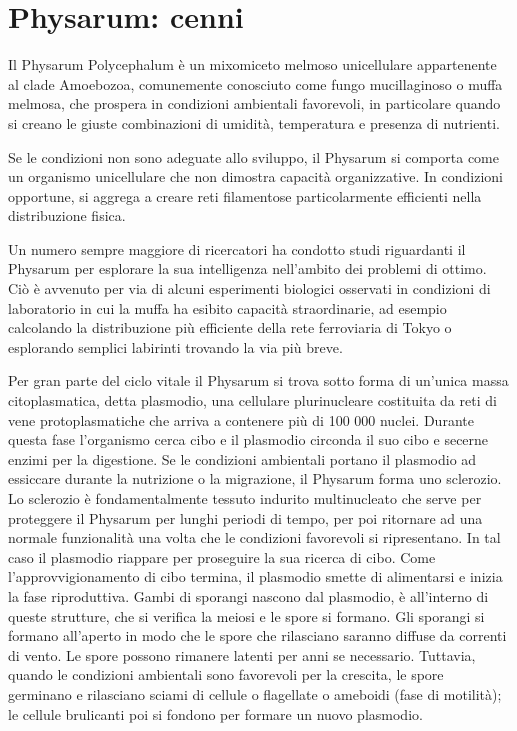 
\section{Physarum: cenni}
\label{physarum_cenni}
Il Physarum Polycephalum è un mixomiceto melmoso unicellulare appartenente al clade Amoebozoa, comunemente conosciuto come fungo mucillaginoso o muffa melmosa, che prospera in condizioni ambientali favorevoli, in particolare quando si creano le giuste combinazioni di umidità, temperatura e presenza di nutrienti.
\par
Se le condizioni non sono adeguate allo sviluppo, il Physarum si comporta come un organismo unicellulare che non dimostra capacità organizzative. In condizioni opportune, si aggrega a creare reti filamentose particolarmente efficienti nella distribuzione fisica.
\par 
Un numero sempre maggiore di ricercatori ha condotto studi riguardanti il Physarum per esplorare la sua intelligenza nell'ambito dei problemi di ottimo. Ciò è avvenuto per via di alcuni esperimenti biologici osservati in condizioni di laboratorio in cui la muffa ha esibito capacità straordinarie, ad esempio calcolando la distribuzione più efficiente della rete ferroviaria di Tokyo o esplorando semplici labirinti trovando la via più breve. 
\par
Per gran parte del ciclo vitale il Physarum si trova sotto forma di un'unica massa citoplasmatica, detta plasmodio, una cellulare plurinucleare costituita da reti di vene protoplasmatiche che arriva a contenere più di 100 000 nuclei.
Durante questa fase l'organismo cerca cibo e il plasmodio circonda il suo cibo e secerne enzimi per la digestione.
Se le condizioni ambientali portano il plasmodio ad essiccare durante la nutrizione o la migrazione, il Physarum forma uno sclerozio. Lo sclerozio è fondamentalmente tessuto indurito multinucleato che serve per proteggere il Physarum per lunghi periodi di tempo, per poi ritornare ad una normale funzionalità una volta che le condizioni favorevoli si ripresentano. In tal caso il plasmodio riappare per proseguire la sua ricerca di cibo.
Come l'approvvigionamento di cibo termina, il plasmodio smette di alimentarsi e inizia la fase riproduttiva. Gambi di sporangi nascono dal plasmodio, è all'interno di queste strutture, che si verifica la meiosi e le spore si formano. Gli sporangi si formano all'aperto in modo che le spore che rilasciano saranno diffuse da correnti di vento.
Le spore possono rimanere latenti per anni se necessario. Tuttavia, quando le condizioni ambientali sono favorevoli per la crescita, le spore germinano e rilasciano sciami di cellule o flagellate o ameboidi (fase di motilità); le cellule brulicanti poi si fondono per formare un nuovo plasmodio. 





